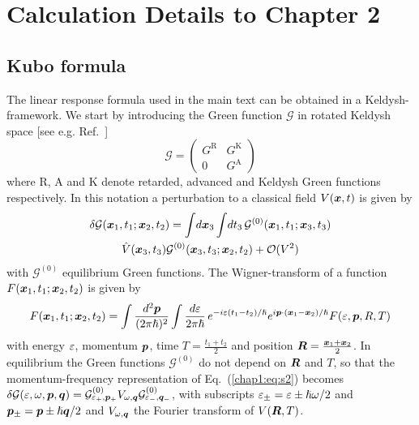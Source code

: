 \chapter{Calculation Details to Chapter 2}
\section{Kubo formula}
The linear response formula used in the main text can be obtained in a Keldysh-framework. We start by introducing the Green function $\mathcal{G}$ in rotated Keldysh space [see e.g. Ref.~\cite{rammer_quantum_1986}]
\begin{equation}
    \mathcal{G}=\begin{pmatrix}G^\text{R}&G^\text{K}\\0&G^\text{A}\end{pmatrix}
\end{equation}
where R, A and K denote retarded, advanced and Keldysh Green functions respectively. In this notation a perturbation to a classical field $V(\boldsymbol{x},t)$ is given by
\begin{multline}
    \delta\mathcal{G}(\boldsymbol{x}_1,t_1;\boldsymbol{x}_2,t_2)=\int\!d\boldsymbol{x}_3\int\!dt_3\, \mathcal{G}^{(0)}(\boldsymbol{x}_1,t_1;\boldsymbol{x}_3,t_3)\\\hat{V}(\boldsymbol{x}_3,t_3)\mathcal{G}^{(0)}(\boldsymbol{x}_3,t_3;\boldsymbol{x}_2,t_2)+\mathcal{O}(V^2)
    \label{chap1:eq:s2}
\end{multline}
with $\mathcal{G}^{(0)}$ equilibrium Green functions. The Wigner-transform of a function $F(\boldsymbol{x}_1,t_1;\boldsymbol{x}_2,t_2)$ is given by
  \begin{multline}
    F(\boldsymbol{x}_1,t_1;\boldsymbol{x}_2,t_2)=\int\frac{d^2\boldsymbol{p}}{(2\pi\hslash)^2}\int \frac{d\varepsilon}{2\pi\hslash}\,e^{-i\varepsilon(t_1-t_2)/\hslash}e^{i\boldsymbol{p}\cdot(\boldsymbol{x}_1-\boldsymbol{x}_2)/\hslash}F(\varepsilon,\boldsymbol{p},R,T)
   \end{multline}
with energy $\varepsilon$, momentum $\boldsymbol{p}$, time $T=\frac{t_1+t_2}{2}$ and position $\boldsymbol{R}=\frac{\boldsymbol{x}_1+\boldsymbol{x}_2}{2}$. In equilibrium the Green functions $\mathcal{G}^{(0)}$ do not depend on $\boldsymbol{R}$ and $T$, so that the momentum-frequency representation of Eq.~(\ref{chap1:eq:s2}) becomes 
   $\delta\mathcal{G}(\varepsilon,\omega,\boldsymbol{p},\boldsymbol{q})= \mathcal{G}^{(0)}_{\varepsilon_+,\boldsymbol{p}_+} V_{\omega,\boldsymbol{q}}\mathcal{G}^{{(0)}}_{\varepsilon_-,\boldsymbol{q}_-}$, 
with subscripts $\varepsilon_\pm=\varepsilon\pm\hslash\omega/2$ and $\boldsymbol{p}_\pm=\boldsymbol{p}\pm\hslash\boldsymbol{q}/2$ and $V_{\omega,\boldsymbol{q}}$ the Fourier transform of $V(\boldsymbol{R},T)$. 

